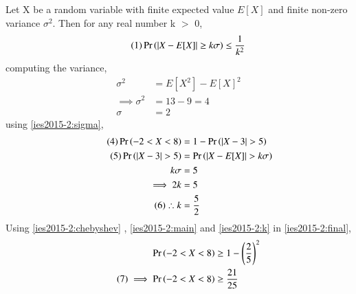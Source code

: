 Let X be a random variable with finite expected value $E[X]$ and finite non-zero variance $\sigma^2$. Then for any real number k $>$ 0,
\begin{equation*}
\tag{1} \label{ies2015-2:chebyshev}
    \Pr\left(\lvert X - E[X] \rvert \ge k\sigma\right) \le \frac{1}{k^{2}}
\end{equation*}
computing the variance,
\begin{align*}
    \sigma^{2} &= E[X^2] - E[X]^2 \\
    \tag{2}
    \implies \sigma^{2} &= 13 - 9 = 4 \\
    \tag{3} \label{ies2015-2:sigma}
    \sigma &= 2
\end{align*}
using \eqref{ies2015-2:sigma},
\begin{align*}\
\tag{4} \label{ies2015-2:final}
    \Pr\left(-2 < X < 8\right) &= 1 - \Pr\left(\lvert X - 3 \rvert > 5\right) \\
    \tag{5} \label{ies2015-2:main}
    \Pr\left(\lvert X - 3 \rvert > 5\right) &= \Pr\left(\lvert X - E[X] \rvert > k\sigma\right) \\
    k\sigma &= 5 \\
    \implies 2k &= 5 \\
    \tag{6} \label{ies2015-2:k}
    \therefore k &= \frac{5}{2}
\end{align*}
Using \eqref{ies2015-2:chebyshev} , \eqref{ies2015-2:main} and \eqref{ies2015-2:k} in \eqref{ies2015-2:final},
\begin{align*}
    \Pr\left(-2 < X < 8\right) &\ge 1 - \left(\frac{2}{5}\right)^2 \\
    \tag{7} \label{ies2015-2:result}
\implies \Pr\left(-2 < X < 8\right) &\ge \frac{21}{25}
\end{align*}
